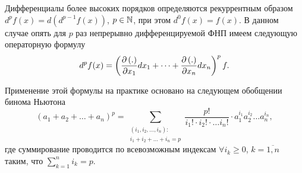 \documentclass[../../main.tex]{subfiles}
\begin{document}
	Дифференциалы более высоких порядков определяются рекуррентным образом 
	$d^pf(x) = d\left(d^{p - 1}f(x)\right)$, $p\in\mathbb{N}$, при этом 
	$d^0f(x) = f(x)$. В данном случае опять для $p$ раз непрерывно 
	дифференцируемой ФНП имеем следующую операторную формулу
	\begin{equation}
		d^pf(x) = \left(\frac{\partial \left(.\right)}{\partial x_1}dx_1 + \dots + 
		\frac{\partial \left(.\right)}{\partial x_n}dx_n\right)^p f.
		\label{24:diff}
	\end{equation}
	
	Применение этой формулы на практике основано на следующем обобщении бинома 
	Ньютона
	\[\left(a_1 + a_2 + \dots + a_n\right)^p = \sum_{
		\substack{
			\left(i_1, i_2, \dots, i_n\right):\\
			i_1 + i_2 + \dots + i_n = p
	}}\frac{p!}{i_1!\cdot i_2!\cdot \dots i_n!}\cdot a_1^{i_1}a_2^{i_2}
	\dots a_n^{i_n},\]
	где суммирование проводится по всевозможным индексам $\forall i_k\ge 0$, 
	$k = \overline{1, n}$ таким, что $\sum\limits_{k = 1}^ni_k = p$.
\end{document}
